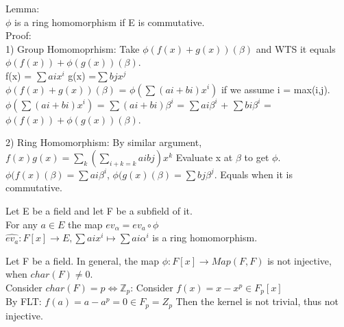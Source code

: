 \documentclass{article}
\newcommand\Z{\ensuremath{\mathbb{Z}}}
\begin{document}
\begin{Proof}
    Lemma:
    \\ $\phi$ is a ring homomorphism if E is commutative.
    \\ Proof: 
\\ 1) Group Homomoprhism:
Take $\phi (f(x) + g(x))(\beta)$ and WTS it equals $\phi (f(x)) + \phi (g(x))(\beta)$. 
\\ f(x) = $\sum ai x^i$ g(x) =$\sum bj x^j$ 
\\ $\phi (f(x) + g(x))(\beta)$ = $\phi(\sum (ai+bi)x^i)$ if we assume i = max(i,j). 
\\$\phi(\sum (ai+bi)x^i)$ = $\sum (ai+bi) \beta^i$ = $\sum ai\beta^i$ +  $\sum bi\beta^i$ = $\phi (f(x)) + \phi (g(x))(\beta)$. 

2) Ring Homomorphism:
By similar argument, $f(x)g(x) = \sum_k (\sum_{i+k=k} aibj) x^k$
Evaluate x at $\beta$ to get $\phi$. 
\\ $\phi(f(x)(\beta) = \sum ai\beta^i$, $\phi(g(x)(\beta) = \sum bj\beta^j$.
Equals when it is commutative. 
\end{Proof}

\begin{theorem}
    Let E be a field and let F be a subfield of it.
    \\For any $a \in E$ the map $ev_\alpha =  \hat{ev_a} \circ \phi$
    \\ $\hat{ev_a} : F[x] \rightarrow E, \sum aix^i \mapsto \sum ai\alpha^i$ is a ring homomorphism. 
\end{theorem}

\begin{note}
    Let F be a field. In general, the map $\phi: F[x] \rightarrow Map(F,F) $ is not injective, when $char(F) \neq 0$.
   \\ Consider $char (F) = p \Leftrightarrow \Z_p $:
   Consider $f(x) = x - x^p \in F_p[x]$
   \\By FLT:  $f(a) = a - a^p = 0 \in F_p = Z_p$ Then the kernel is not trivial, thus not injective. 
\end{note}
\end{document}
